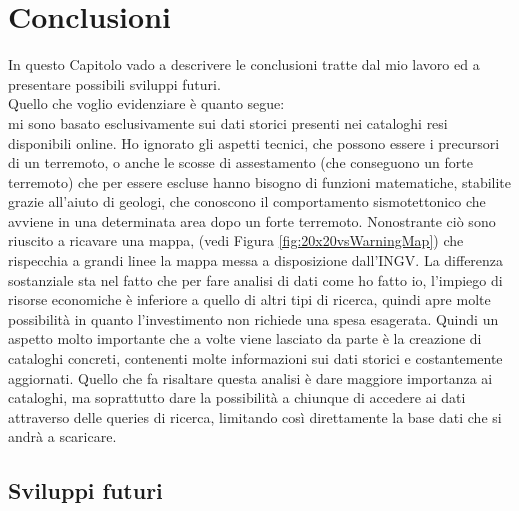 \chapter{Conclusioni}\label{conclusion}
In questo Capitolo vado a descrivere le conclusioni tratte dal mio lavoro ed a presentare possibili sviluppi futuri.\\
Quello che voglio evidenziare \`e quanto segue:\\
mi sono basato esclusivamente sui dati storici presenti nei cataloghi resi disponibili online. Ho ignorato gli aspetti tecnici, che possono essere i precursori di un terremoto, o anche le scosse di assestamento (che conseguono un forte terremoto) che per essere escluse hanno bisogno di funzioni matematiche, stabilite grazie all'aiuto di geologi, che conoscono il comportamento sismotettonico che avviene in una determinata area dopo un forte terremoto. Nonostrante ci\`o sono riuscito a ricavare una mappa, (vedi Figura \ref{fig:20x20vsWarningMap}) che rispecchia a grandi linee la mappa messa a disposizione dall'INGV. La differenza sostanziale sta nel fatto che per fare analisi di dati come ho fatto io, l'impiego di risorse economiche \`e inferiore a quello di altri tipi di ricerca, quindi apre molte possibilit\`a in quanto l'investimento non richiede una spesa esagerata. Quindi un aspetto molto importante che a volte viene lasciato da parte \`e la creazione di cataloghi concreti, contenenti molte informazioni sui dati storici e costantemente aggiornati. Quello che fa risaltare questa analisi \`e dare maggiore importanza ai cataloghi, ma soprattutto dare la possibilit\`a a chiunque di accedere ai dati attraverso delle queries di ricerca, limitando cos\`i direttamente la base dati che si andr\`a a scaricare.

\section{Sviluppi futuri}

